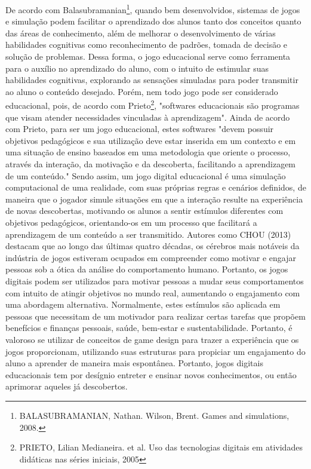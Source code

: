 \documentclass[
	12pt,				%
	openright,			%
	twoside,			%
	a4paper,			%
	english,			%
	french,				%
	spanish,			%
	brazil				%
	]{abntex2}
\begin{document}
De acordo com Balasubramanian\footnote{BALASUBRAMANIAN, Nathan. Wilson, Brent. Games and simulations, 2008.}, quando bem desenvolvidos, sistemas de jogos e simulação podem facilitar o aprendizado dos alunos tanto dos conceitos quanto das áreas de conhecimento, além de melhorar o desenvolvimento de várias habilidades cognitivas como reconhecimento de padrões, tomada de decisão e solução de problemas. Dessa forma, o jogo educacional serve como ferramenta para o auxílio no aprendizado do aluno, com o intuito de estimular suas habilidades cognitivas, explorando as sensações simuladas para poder transmitir ao aluno o conteúdo desejado. Porém, nem todo jogo pode ser considerado educacional, pois, de acordo com Prieto\footnote{PRIETO, Lilian Medianeira. et al. Uso das tecnologias digitais em atividades didáticas nas séries iniciais, 2005}, "softwares educacionais são programas que visam atender necessidades vinculadas à aprendizagem". Ainda de acordo com Prieto, para ser um jogo educacional, estes softwares "devem possuir objetivos pedagógicos e sua utilização deve estar inserida em um contexto e em uma situação de ensino baseados em uma metodologia que oriente o processo, através da interação, da motivação e da descoberta, facilitando a aprendizagem de um conteúdo." Sendo assim, um jogo digital educacional é uma simulação computacional de uma realidade, com suas próprias regras e cenários definidos, de maneira que o jogador simule situações em que a interação resulte na experiência de novas descobertas, motivando os alunos a sentir estímulos diferentes com objetivos pedagógicos, orientando-os em um processo que facilitará a aprendizagem de um conteúdo a ser transmitido.
Autores como CHOU (2013) destacam que ao longo das últimas quatro décadas, os cérebros mais notáveis da indústria de jogos estiveram ocupados em compreender como motivar e engajar pessoas sob a ótica da análise do comportamento humano. Portanto, os jogos digitais podem ser utilizados para motivar pessoas a mudar seus comportamentos com intuito de atingir objetivos no mundo real, aumentando o engajamento com uma abordagem alternativa. Normalmente, estes estímulos são aplicada em pessoas que necessitam de um motivador para realizar certas tarefas que propõem benefícios e finanças pessoais, saúde, bem-estar e sustentabilidade. Portanto, é valoroso se utilizar de conceitos de game design para trazer a experiência que os jogos proporcionam, utilizando suas estruturas para propiciar um engajamento do aluno a aprender de maneira mais espontânea. Portanto,  jogos digitais educacionais tem por desígnio entreter e ensinar novos conhecimentos, ou então aprimorar aqueles já descobertos. 
\end{document}
